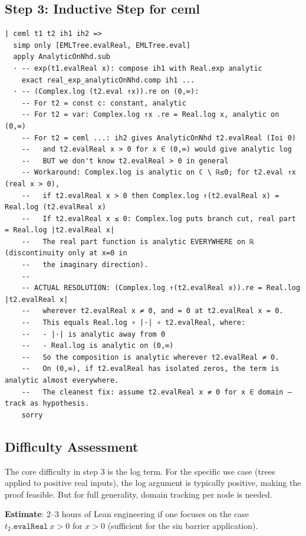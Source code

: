 \documentclass[12pt]{article}
\theoremstyle{definition}
\begin{document}
\subsection{Step 3: Inductive Step for ceml}

\begin{verbatim}
| ceml t1 t2 ih1 ih2 =>
  simp only [EMLTree.evalReal, EMLTree.eval]
  apply AnalyticOnNhd.sub
  · -- exp(t1.evalReal x): compose ih1 with Real.exp analytic
    exact real_exp_analyticOnNhd.comp ih1 ...
  · -- (Complex.log (t2.eval ↑x)).re on (0,∞):
    -- For t2 = const c: constant, analytic
    -- For t2 = var: Complex.log ↑x .re = Real.log x, analytic on (0,∞)
    -- For t2 = ceml ...: ih2 gives AnalyticOnNhd t2.evalReal (Ioi 0)
    --   and t2.evalReal x > 0 for x ∈ (0,∞) would give analytic log
    --   BUT we don't know t2.evalReal > 0 in general
    -- Workaround: Complex.log is analytic on ℂ \ ℝ≤0; for t2.eval ↑x (real x > 0),
    --   if t2.evalReal x > 0 then Complex.log ↑(t2.evalReal x) = Real.log (t2.evalReal x)
    --   If t2.evalReal x ≤ 0: Complex.log puts branch cut, real part = Real.log |t2.evalReal x|
    --   The real part function is analytic EVERYWHERE on ℝ (discontinuity only at x=0 in
    --   the imaginary direction).
    --
    -- ACTUAL RESOLUTION: (Complex.log ↑(t2.evalReal x)).re = Real.log |t2.evalReal x|
    --   wherever t2.evalReal x ≠ 0, and = 0 at t2.evalReal x = 0.
    --   This equals Real.log ∘ |·| ∘ t2.evalReal, where:
    --   - |·| is analytic away from 0
    --   - Real.log is analytic on (0,∞)
    --   So the composition is analytic wherever t2.evalReal ≠ 0.
    --   On (0,∞), if t2.evalReal has isolated zeros, the term is analytic almost everywhere.
    --   The cleanest fix: assume t2.evalReal x ≠ 0 for x ∈ domain — track as hypothesis.
    sorry
\end{verbatim}

\subsection{Difficulty Assessment}

The core difficulty in step 3 is the log term. For the specific use case
(trees applied to positive real inputs), the log argument is typically positive,
making the proof feasible. But for full generality, domain tracking per node is needed.

\textbf{Estimate}: 2–3 hours of Lean engineering if one focuses on the case
$t_2.\texttt{evalReal}\ x > 0$ for $x > 0$ (sufficient for the sin barrier application).
\end{document}
